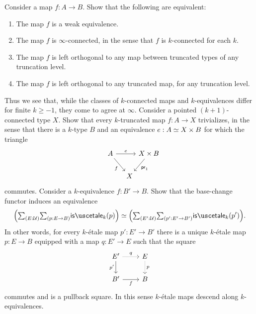 \begin{exercises}
\begin{enumerate}
\end{enumerate}
\exercise Consider a map $f:A\to B$. Show that the following are equivalent:
  \begin{enumerate}
  \item The map $f$ is a weak equivalence.
  \item The map $f$ is $\infty$-connected, in the sense that $f$ is $k$-connected for each $k$.
  \item The map $f$ is left orthogonal to any map between truncated types of any truncation level.
  \item The map $f$ is left orthogonal to any truncated map, for any truncation level.
  \end{enumerate}
  Thus we see that, while the classes of $k$-connected maps and $k$-equivalences differ for finite $k\geq-1$, they come to agree at $\infty$.
  \exercise Consider a pointed $(k+1)$-connected type $X$. Show that every $k$-truncated map $f:A\to X$ trivializes, in the sense that there is a $k$-type $B$ and an equivalence $e:\eqv{A}{X\times B}$ for which the triangle
  \begin{equation*}
    \begin{tikzcd}[column sep=0]
      A \arrow[rr,"e"] \arrow[dr,swap,"f"] & & X\times B \arrow[dl,"\proj 1"] \\
      \phantom{X\times B} & X
    \end{tikzcd}
  \end{equation*}
  commutes.
  \exercise Consider a $k$-equivalence $f:B'\to B$. Show that the base-change functor induces an equivalence
  \begin{equation*}
    \Big(\sm{E:\UU}{p:E\to B}\isetale_k(p)\Big)\simeq\Big(\sm{E':\UU}{p':E'\to B'}\isetale_k(p')\Big).
  \end{equation*}
  In other words, for every $k$-\'etale map $p':E'\to B'$ there is a unique $k$-\'etale map $p:E\to B$ equipped with a map $q:E'\to E$ such that the square
  \begin{equation*}
    \begin{tikzcd}
      E' \arrow[d,swap,"{p'}"] \arrow[r,densely dotted,"q"] & E \arrow[d,densely dotted,"p"] \\
      B' \arrow[r,swap,"f"] & B
    \end{tikzcd}
  \end{equation*}
  commutes and is a pullback square. In this sense $k$-\'etale maps descend along $k$-equivalences.
\end{exercises}
